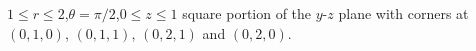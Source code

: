{$1\leq r\leq 2$,\quad $\theta= \pi/2$,\quad $0\leq z\leq 1$
}
{\A square portion of the $y$-$z$ plane with corners at $(0,1,0)$, $(0,1,1)$, $(0,2,1)$ and $(0,2,0)$.}
